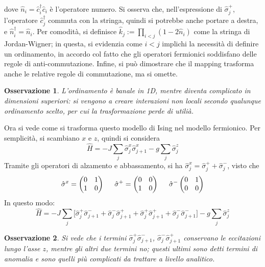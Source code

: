 \documentclass[11pt, a4paper]{scrartcl}
\theoremstyle{style}
\newtheorem{osservazione}{Osservazione}[section]
\theoremstyle{style1}
\numberwithin{equation}{subsection}
\begin{document}
dove $\hat{n}_i = \hat{c}^\dagger _i \hat{c}_i$ \`e l'operatore numero. 
Si osserva che, nell'espressione di $\hat{\sigma }_j^+$, l'operatore $\hat{c}_j^\dagger $ commuta con la stringa, quindi si potrebbe anche portare a destra, e $\hat{n}_i ^\dagger  = \hat{n}_i$. 
Per comodit\`a, si definisce $\hat{k}_j:=\prod_{i<j} \left(1 - 2 \hat{n}_i\right) $ come la stringa di Jordan-Wigner; in questa, si evidenzia come $i < j$ implichi la necessit\`a di definire un ordinamento, in accordo col fatto che gli operatori fermionici soddisfano delle regole di anti-commutazione.
Infine, si pu\`o dimostrare che il mapping trasforma anche le relative regole di commutazione, ma si omette.
\begin{osservazione}
L'ordinamento \`e banale in 1D, mentre diventa complicato in dimensioni superiori: si vengono a creare interazioni non locali secondo qualunque ordinamento scelto, per cui la trasformazione perde di utili\`a.
\end{osservazione}
\noindent Ora si vede come si trasforma questo modello di Ising nel modello fermionico.
Per semplicit\`a, si scambiano $x$ e $z$, quindi si considera 
\[
\hat{H} = - J \sum_{j}^{} \hat{\sigma }_j^x \hat{\sigma }_{j+1} ^x - g \sum_{j}^{} \hat{\sigma }_j^z
\] 
Tramite gli operatori di alzamento e abbassamento, si ha $\hat{\sigma }_j^x = \hat{\sigma }_j ^+ + \hat{\sigma  }_j^-$, visto che
\[
	\hat{\sigma }^x = \begin{pmatrix} 0&1 \\ 1 &0  \end{pmatrix} \hspace{.5cm}\hat{\sigma }^+ = \begin{pmatrix} 0 & 0 \\ 1 & 0 \end{pmatrix} \hspace{.5cm} \hat{\sigma }^- \begin{pmatrix}  0  & 1 \\ 0 & 0  \end{pmatrix}  
\] 
In questo modo:
\[
	\hat{H} = - J \sum_{j}^{} \Big[\hat{\sigma }_j^+ \hat{\sigma }^- _{j+1} + \hat{\sigma }_j^- \hat{\sigma }_{j+1} ^+ + \hat{\sigma }_j^+ \hat{\sigma }_{j+1} ^+	+ \hat{\sigma }_j ^- \hat{\sigma }_{j+1} ^-\Big]-g \sum_{j}^{} \hat{\sigma }_j^z
\] 
\begin{osservazione}
Si vede che i termini $\hat{\sigma }_j^+ \hat{\sigma }^- _{j+1}$, $ \hat{\sigma }_j^- \hat{\sigma }_{j+1} ^+$ conservano le eccitazioni lungo l'asse $z$, mentre gli altri due termini no; questi ultimi sono detti \textit{termini di anomalia} e sono quelli pi\`u complicati da trattare a livello analitico.
\end{osservazione}
\end{document}
